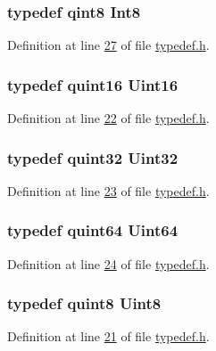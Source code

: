 \hypertarget{a00001_aafb609548b1aa0152c46f9205b79d0f0}{
\subsubsection[{Int8}]{\setlength{\rightskip}{0pt plus 5cm}typedef qint8 {\bf Int8}}}\label{a00001_aafb609548b1aa0152c46f9205b79d0f0}


Definition at line \hyperlink{a00001_source_l00027}{27} of file \hyperlink{a00001_source}{typedef.\+h}.

\hypertarget{a00001_aae7407b021d43f7193a81a58cfb3e297}{
\subsubsection[{Uint16}]{\setlength{\rightskip}{0pt plus 5cm}typedef quint16 {\bf Uint16}}}\label{a00001_aae7407b021d43f7193a81a58cfb3e297}


Definition at line \hyperlink{a00001_source_l00022}{22} of file \hyperlink{a00001_source}{typedef.\+h}.

\hypertarget{a00001_ab56a7153a5b218eac7698ff141009735}{
\subsubsection[{Uint32}]{\setlength{\rightskip}{0pt plus 5cm}typedef quint32 {\bf Uint32}}}\label{a00001_ab56a7153a5b218eac7698ff141009735}


Definition at line \hyperlink{a00001_source_l00023}{23} of file \hyperlink{a00001_source}{typedef.\+h}.

\hypertarget{a00001_a3ea80e954e940df6ac162951653f72c4}{
\subsubsection[{Uint64}]{\setlength{\rightskip}{0pt plus 5cm}typedef quint64 {\bf Uint64}}}\label{a00001_a3ea80e954e940df6ac162951653f72c4}


Definition at line \hyperlink{a00001_source_l00024}{24} of file \hyperlink{a00001_source}{typedef.\+h}.

\hypertarget{a00001_a979e3e23b9a449e69ab6a8a83b6042f8}{
\subsubsection[{Uint8}]{\setlength{\rightskip}{0pt plus 5cm}typedef quint8 {\bf Uint8}}}\label{a00001_a979e3e23b9a449e69ab6a8a83b6042f8}


Definition at line \hyperlink{a00001_source_l00021}{21} of file \hyperlink{a00001_source}{typedef.\+h}.


